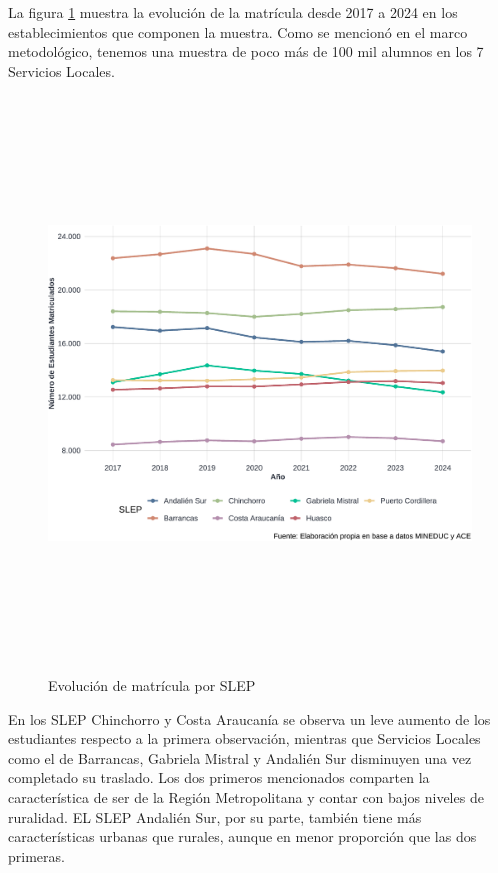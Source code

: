 \documentclass[
  12pt,
  letterpaper,
]{article}
\begin{document}
La figura \ref{fig:grafico-matricula} muestra la evolución de la matrícula desde 2017 a 2024 en los establecimientos que componen la muestra.
Como se mencionó en el marco metodológico, tenemos una muestra de poco más de 100 mil alumnos en los 7 Servicios Locales.

\begin{figure}

{\centering \includegraphics[width=0.8\linewidth,height=6in]{tesis_ver_final_files/figure-latex/grafico-matricula-1} 

}

\caption{Evolución de matrícula por SLEP}\label{fig:grafico-matricula}
\end{figure}

En los SLEP Chinchorro y Costa Araucanía se observa un leve aumento de los estudiantes respecto a la primera observación, mientras que Servicios Locales como el de Barrancas, Gabriela Mistral y Andalién Sur disminuyen una vez completado su traslado.
Los dos primeros mencionados comparten la característica de ser de la Región Metropolitana y contar con bajos niveles de ruralidad.
EL SLEP Andalién Sur, por su parte, también tiene más características urbanas que rurales, aunque en menor proporción que las dos primeras.
\end{document}
